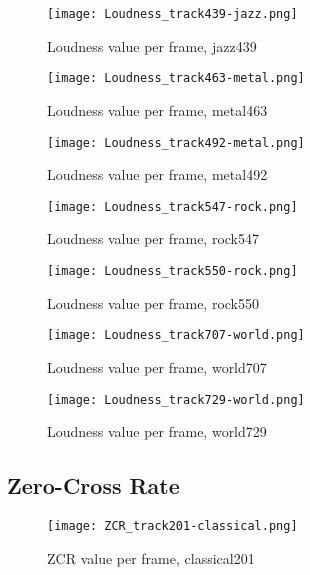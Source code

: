 \documentclass{article} %
\begin{document}
\begin{figure}
\centering
\texttt{[image: Loudness\_track439-jazz.png]}
\caption{Loudness value per frame, jazz439}
\label{fig:loudness_439}
\end{figure}

\begin{figure}
\centering
\texttt{[image: Loudness\_track463-metal.png]}
\caption{Loudness value per frame, metal463}
\label{fig:loudness_463}
\end{figure}


\begin{figure}
\centering
\texttt{[image: Loudness\_track492-metal.png]}
\caption{Loudness value per frame, metal492}
\label{fig:loudness_492}
\end{figure}


\begin{figure}
\centering
\texttt{[image: Loudness\_track547-rock.png]}
\caption{Loudness value per frame, rock547}
\label{fig:loudness_547}
\end{figure}


\begin{figure}
\centering
\texttt{[image: Loudness\_track550-rock.png]}
\caption{Loudness value per frame, rock550}
\label{fig:loudness_550}
\end{figure}


\begin{figure}
\centering
\texttt{[image: Loudness\_track707-world.png]}
\caption{Loudness value per frame, world707}
\label{fig:loudness_707}
\end{figure}


\begin{figure}[h!]
\centering
\texttt{[image: Loudness\_track729-world.png]}
\caption{Loudness value per frame, world729}
\label{fig:loudness_729}
\end{figure}

\clearpage
\subsection{Zero-Cross Rate}
\label{sec:ZCRFigures}

\begin{figure}[ht!]
\centering
\texttt{[image: ZCR\_track201-classical.png]}
\caption{ZCR value per frame, classical201}
\label{fig:ZCR_201}
\end{figure}
\end{document}
